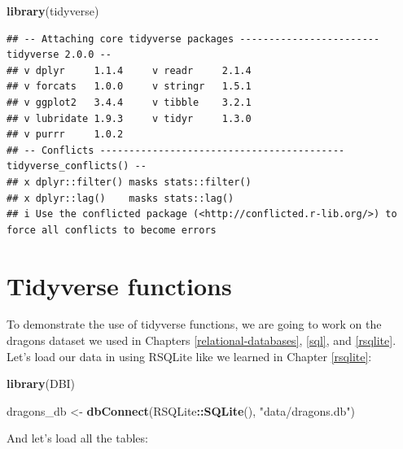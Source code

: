 \documentclass[
]{book}
\newenvironment{Shaded}{\begin{snugshade}}{\end{snugshade}}
\newcommand{\FunctionTok}[1]{\textcolor[rgb]{0.13,0.29,0.53}{\textbf{#1}}}
\newcommand{\NormalTok}[1]{#1}
\newcommand{\OtherTok}[1]{\textcolor[rgb]{0.56,0.35,0.01}{#1}}
\newcommand{\SpecialCharTok}[1]{\textcolor[rgb]{0.81,0.36,0.00}{\textbf{#1}}}
\newcommand{\StringTok}[1]{\textcolor[rgb]{0.31,0.60,0.02}{#1}}
\begin{document}
\begin{Shaded}
\begin{Highlighting}[]
\FunctionTok{library}\NormalTok{(tidyverse)}
\end{Highlighting}
\end{Shaded}

\begin{verbatim}
## -- Attaching core tidyverse packages ------------------------ tidyverse 2.0.0 --
## v dplyr     1.1.4     v readr     2.1.4
## v forcats   1.0.0     v stringr   1.5.1
## v ggplot2   3.4.4     v tibble    3.2.1
## v lubridate 1.9.3     v tidyr     1.3.0
## v purrr     1.0.2     
## -- Conflicts ------------------------------------------ tidyverse_conflicts() --
## x dplyr::filter() masks stats::filter()
## x dplyr::lag()    masks stats::lag()
## i Use the conflicted package (<http://conflicted.r-lib.org/>) to force all conflicts to become errors
\end{verbatim}

\hypertarget{tidyverse-functions}{%
\section{Tidyverse functions}\label{tidyverse-functions}}

To demonstrate the use of tidyverse functions, we are going to work on the
dragons dataset we used in Chapters \ref{relational-databases},
\ref{sql}, and \ref{rsqlite}. Let's load our data in
using RSQLite like we learned in Chapter \ref{rsqlite}:

\begin{Shaded}
\begin{Highlighting}[]
\FunctionTok{library}\NormalTok{(DBI)}

\NormalTok{dragons\_db }\OtherTok{\textless{}{-}} \FunctionTok{dbConnect}\NormalTok{(RSQLite}\SpecialCharTok{::}\FunctionTok{SQLite}\NormalTok{(), }\StringTok{"data/dragons.db"}\NormalTok{)}
\end{Highlighting}
\end{Shaded}

And let's load all the tables:
\end{document}
